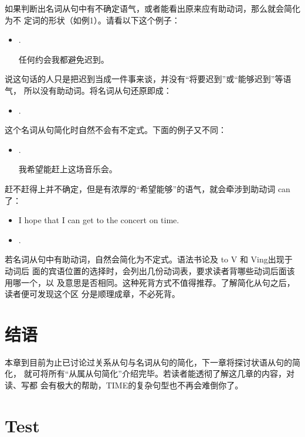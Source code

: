 如果判断出名词从句中有不确定语气，或者能看出原来应有助动词，那么就会简化为不
定词的形状（如例1）。请看以下这个例子：
\begin{itemize}
\item {}  .

  任何约会我都避免迟到。
\end{itemize}
说这句话的人只是把迟到当成一件事来谈，并没有“将要迟到”或“能够迟到”等语气，
所以没有助动词。将名词从句还原即成：
\begin{itemize}
\item {}  .
\end{itemize}

这个名词从句简化时自然不会有不定式。下面的例子又不同：
\begin{itemize}
\item {}  .

  我希望能赶上这场音乐会。
\end{itemize}
赶不赶得上并不确定，但是有浓厚的“希望能够”的语气，就会牵涉到助动词 can
了：
\begin{itemize}
\item I hope that I can get to the concert on time.

\item {}  .
\end{itemize}

若名词从句中有助动词，自然会简化为不定式。语法书论及 to V 和 Ving出现于动词后
面的宾语位置的选择时，会列出几份动词表，要求读者背哪些动词后面该用哪一个，以
及意思是否相同。这种死背方式不值得推荐。了解简化从句之后，读者便可发现这个区
分是顺理成章，不必死背。

\section{结语}

本章到目前为止已讨论过关系从句与名词从句的简化，下一章将探讨状语从句的简化，
就可将所有“从属从句简化”介绍完毕。若读者能透彻了解这几章的内容，对读、写都
会有极大的帮助，TIME的复杂句型也不再会难倒你了。

\section{Test}

